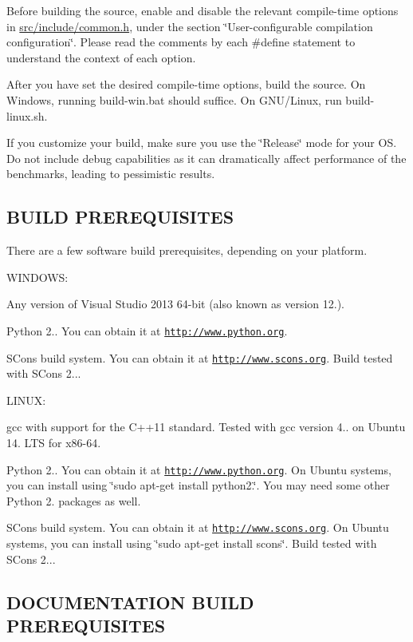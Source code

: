 Before building the source, enable and disable the relevant compile-\/time options in \hyperlink{common_8h}{src/include/common.\+h}, under the section \char`\"{}\+User-\/configurable compilation configuration\char`\"{}. Please read the comments by each \#define statement to understand the context of each option.

After you have set the desired compile-\/time options, build the source. On Windows, running build-\/win.\+bat should suffice. On G\+N\+U/\+Linux, run build-\/linux.\+sh.

If you customize your build, make sure you use the \char`\"{}\+Release\char`\"{} mode for your O\+S. Do not include debug capabilities as it can dramatically affect performance of the benchmarks, leading to pessimistic results. 

 \subsection*{B\+U\+I\+L\+D P\+R\+E\+R\+E\+Q\+U\+I\+S\+I\+T\+E\+S }

There are a few software build prerequisites, depending on your platform.

W\+I\+N\+D\+O\+W\+S\+:


\begin{DoxyItemize}
\item Any version of Visual Studio 2013 64-\/bit (also known as version 12.).
\item Python 2.. You can obtain it at \href{http://www.python.org}{\tt http\+://www.\+python.\+org}.
\item S\+Cons build system. You can obtain it at \href{http://www.scons.org}{\tt http\+://www.\+scons.\+org}. Build tested with S\+Cons 2...
\end{DoxyItemize}

L\+I\+N\+U\+X\+:


\begin{DoxyItemize}
\item gcc with support for the C++11 standard. Tested with gcc version 4.. on Ubuntu 14. L\+T\+S for x86-\/64.
\item Python 2.. You can obtain it at \href{http://www.python.org}{\tt http\+://www.\+python.\+org}. On Ubuntu systems, you can install using \char`\"{}sudo apt-\/get install python2.\char`\"{}. You may need some other Python 2. packages as well.
\item S\+Cons build system. You can obtain it at \href{http://www.scons.org}{\tt http\+://www.\+scons.\+org}. On Ubuntu systems, you can install using \char`\"{}sudo apt-\/get install scons\char`\"{}. Build tested with S\+Cons 2... 

 \subsection*{D\+O\+C\+U\+M\+E\+N\+T\+A\+T\+I\+O\+N B\+U\+I\+L\+D P\+R\+E\+R\+E\+Q\+U\+I\+S\+I\+T\+E\+S }
\end{DoxyItemize}

